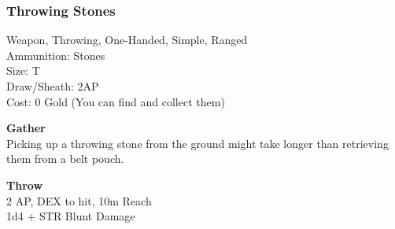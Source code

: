 \subsubsection{Throwing Stones}\label{weapon:throwingStones}
Weapon, Throwing, One-Handed, Simple, Ranged\\
Ammunition: Stones\\
Size: T\\
Draw/Sheath: 2AP\\
Cost: 0 Gold (You can find and collect them)

\textbf{Gather}\\
Picking up a throwing stone from the ground might take longer than retrieving them from a belt pouch.

\textbf{Throw}\\
2 AP, DEX to hit, 10m Reach\\
1d4 + \texttimes STR Blunt Damage

